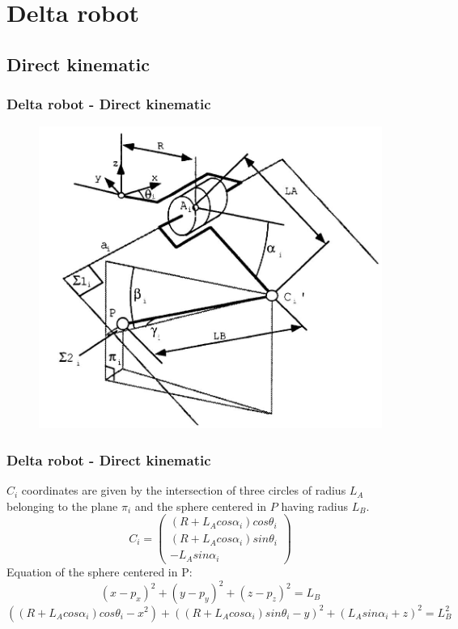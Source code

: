 %
\section[Delta robot]{Delta robot}
\begin{frame}

\end{frame}

\subsection{Direct kinematic}
\begin{frame}
\frametitle{Delta robot - Direct kinematic}
	\begin{figure}
		\includegraphics[width=.5\linewidth]{img/DeltaRobotClavelpg26.JPG}
	\end{figure}
\end{frame}
%
\begin{frame}
\frametitle{Delta robot - Direct kinematic}
	$C_i$ coordinates are given by the intersection of three circles of radius $L_A$ belonging to the plane $\pi_i$ and the sphere centered in $P$ having radius $L_B$.
	\[
	C_i =%
	\begin{pmatrix}
		(R + L_Acos\alpha_i)cos\theta_i\\
		(R + L_Acos\alpha_i)sin\theta_i\\
		-L_Asin\alpha_i
	\end{pmatrix}
	\]
	Equation of the sphere centered in P:
	\begin{equation}
		(x - p_x)^2 + (y - p_y)^2 + (z - p_z)^2 = L_B
	\end{equation}
	\begin{equation}
		((R + L_Acos\alpha_i)cos\theta_i - x^2) + ((R + L_Acos\alpha_i)sin\theta_i - y)^2 + (L_Asin\alpha_i + z)^2 = L_B^2
	\end{equation}

\end{frame}
